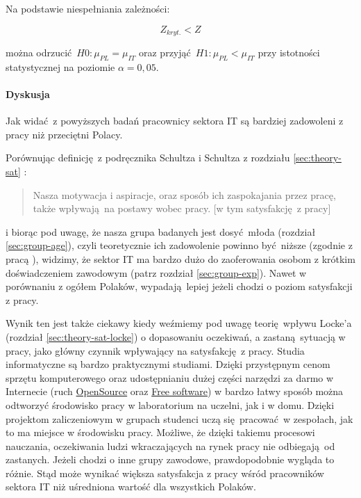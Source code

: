 Na podstawie niespełniania zależności:

\begin{equation}
  Z_{kryt.} < Z
\end{equation}

można odrzucić $H0: \mu_{PL} = \mu_{IT}$ oraz przyjąć $H1: \mu_{PL} < \mu_{IT}$ przy istotności statystycznej na poziomie $\alpha = 0,05$.

\paragraph{Dyskusja}
Jak widać z powyższych badań pracownicy sektora IT są bardziej zadowoleni z pracy niż przeciętni Polacy. 

Porównując definicję z podręcznika Schultza i Schultza z rozdziału \ref{sec:theory-sat} \citep{SchultzSat}:
\begin{quote}
  Nasza motywacja i aspiracje, oraz sposób ich zaspokajania przez pracę, także wpływają na postawy wobec pracy. [w tym satysfakcję z pracy]
\end{quote}
i biorąc pod uwagę, że nasza grupa badanych jest dosyć młoda (rozdział \ref{sec:group-age}), czyli teoretycznie ich zadowolenie powinno być niższe (zgodnie z pracą \cite{}), widzimy, że sektor IT ma bardzo dużo do zaoferowania osobom z krótkim doświadczeniem zawodowym (patrz rozdział \ref{sec:group-exp}). Nawet w porównaniu z ogółem Polaków, wypadają lepiej jeżeli chodzi o poziom satysfakcji z pracy.

Wynik ten jest także ciekawy kiedy weźmiemy pod uwagę teorię wpływu Locke'a (rozdział \ref{sec:theory-sat-locke}) o dopasowaniu oczekiwań, a zastaną sytuacją w pracy, jako główny czynnik wpływający na satysfakcję z pracy. Studia informatyczne są bardzo praktycznymi studiami. Dzięki przystępnym cenom sprzętu komputerowego oraz udostępnianiu dużej części narzędzi za darmo w Internecie (ruch
\href{http://en.wikipedia.org/wiki/Open-source_software}{OpenSource} oraz \href{http://en.wikipedia.org/wiki/Free_software}{Free software}) w bardzo łatwy sposób można odtworzyć środowisko pracy w laboratorium na uczelni, jak i w domu. Dzięki projektom zaliczeniowym w grupach studenci uczą się pracować w zespołach, jak to ma miejsce w środowisku pracy. Możliwe, że dzięki takiemu procesowi nauczania, oczekiwania ludzi wkraczających na rynek pracy nie odbiegają od zastanych. Jeżeli
chodzi o inne grupy zawodowe, prawdopodobnie wygląda to różnie. Stąd może wynikać większa satysfakcja z pracy wśród pracowników sektora IT niż uśredniona wartość dla wszystkich Polaków.

